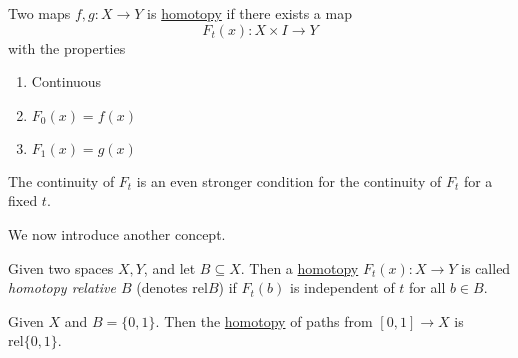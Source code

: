 \begin{prev}
	Two maps \(f, g\colon X\to Y\) is \hyperref[def:homotopy]{homotopy} if there exists a map
	\[
		F_t(x)\colon X\times I\to Y
	\]
	with the properties
	\begin{enumerate}[(1)]
		\item Continuous
		\item \(F_0(x) = f(x)\)
		\item \(F_1(x) = g(x)\)
	\end{enumerate}
	\begin{remark}
		The continuity of \(F_t\) is an even stronger condition for the continuity of \(F_t\) for a fixed \(t\).
	\end{remark}
\end{prev}

We now introduce another concept.
\begin{definition}\label{def:homotopy-relative}
	Given two spaces \(X, Y\), and let \(B\subseteq X\). Then a \hyperref[def:homotopy]{homotopy} \(F_t(x)\colon X\to Y\) is called
	\emph{homotopy relative \(B\)} (denotes \(\mathrm{rel} B\)) if \(F_t(b)\) is independent of \(t\) for all \(b\in B\).
\end{definition}

\begin{eg}
	Given \(X\) and \(B = \{0, 1\}\). Then the \hyperref[def:homotopy]{homotopy} of paths from \([0, 1]\to X\) is
	\(\mathrm{rel} \{0, 1\}\).
	\begin{figure}[H]
		\centering
		\label{fig:eg:rel-homotopy}
	\end{figure}
\end{eg}

